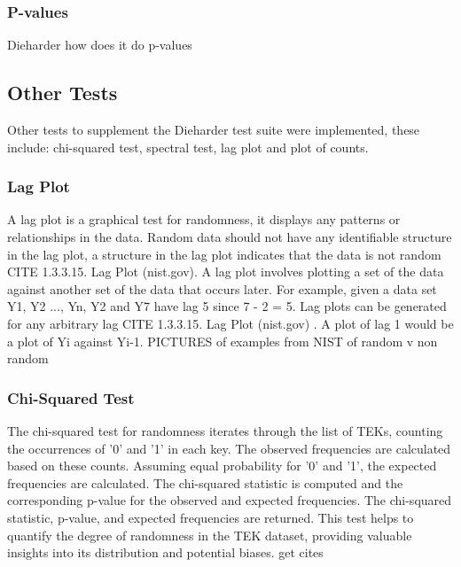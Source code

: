 \subsubsection{P-values}

Dieharder how does it do p-values

\subsection{Other Tests}

Other tests to supplement the Dieharder test suite were implemented, these include: chi-squared test, spectral test, lag plot and plot of counts.\newline

\subsubsection{Lag Plot}
A lag plot is a graphical test for randomness, it displays any patterns or relationships in the data. Random data should not have any identifiable structure in the lag plot, a structure in the lag plot indicates that the data is not random CITE 1.3.3.15. Lag Plot (nist.gov). A lag plot involves plotting a set of the data against another set of the data that occurs later. For example, given a data set Y1, Y2 ..., Yn, Y2 and Y7 have lag 5 since 7 - 2 = 5. Lag plots can be generated for any arbitrary lag CITE 1.3.3.15. Lag Plot (nist.gov) . A plot of lag 1 would be a plot of Yi against Yi-1. PICTURES of examples from NIST of random v non random

\subsubsection{Chi-Squared Test}
The chi-squared test for randomness iterates through the list of TEKs, counting the occurrences of '0' and '1' in each key. The observed frequencies are calculated based on these counts. Assuming equal probability for '0' and '1', the expected frequencies are calculated. The chi-squared statistic is computed and the corresponding p-value for the observed and expected frequencies. The chi-squared statistic, p-value, and expected frequencies are returned. This test helps to quantify the degree of randomness in the TEK dataset, providing valuable insights into its distribution and potential biases. get cites

